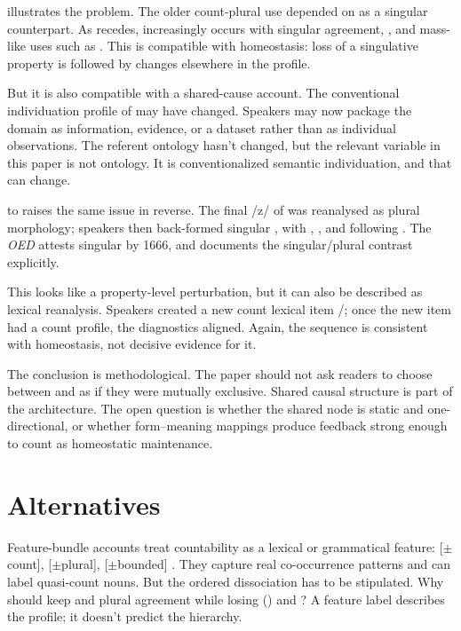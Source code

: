 \documentclass[12pt,a4paper]{article}
\begin{document}
 illustrates the problem. The older count-plural use depended on  as a singular counterpart. As  recedes,  increasingly occurs with singular agreement, , and mass-like uses such as  \citep{garner2016}. This is compatible with homeostasis: loss of a singulative property is followed by changes elsewhere in the profile.

But it is also compatible with a shared-cause account. The conventional individuation profile of  may have changed. Speakers may now package the domain as information, evidence, or a dataset rather than as individual observations. The referent ontology hasn't changed, but the relevant variable in this paper is not ontology. It is conventionalized semantic individuation, and that can change.

 to  raises the same issue in reverse. The final /z/ of  was reanalysed as plural morphology; speakers then back-formed singular , with , , and  following \citep[s.v.\ , \emph{n.\textsuperscript{1}}]{oed}. The \emph{OED} attests singular  by 1666, and \textcite[p.~49]{greenwood1711} documents the singular/plural contrast explicitly.

This looks like a property-level perturbation, but it can also be described as lexical reanalysis. Speakers created a new count lexical item /; once the new item had a count profile, the diagnostics aligned. Again, the sequence is consistent with homeostasis, not decisive evidence for it.

The conclusion is methodological. The paper should not ask readers to choose between  and  as if they were mutually exclusive. Shared causal structure is part of the architecture. The open question is whether the shared node is static and one-directional, or whether form--meaning mappings produce feedback strong enough to count as homeostatic maintenance.

\section{Alternatives}\label{sec:alternatives-v3}

Feature-bundle accounts treat countability as a lexical or grammatical feature: [\(\pm\)count], [\(\pm\)plural], [\(\pm\)bounded] \citep{chomsky1965,allan1980}. They capture real co-occurrence patterns and can label quasi-count nouns. But the ordered dissociation has to be stipulated. Why should  keep  and plural agreement while losing () and ? A feature label describes the profile; it doesn't predict the hierarchy.
\end{document}
